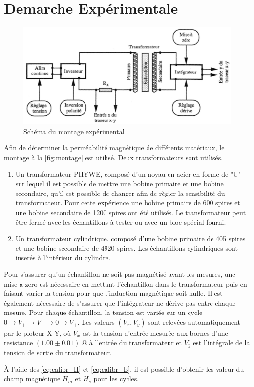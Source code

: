 \section{Demarche Expérimentale}

\begin{figure}[h]
    \centering
    \includegraphics[width=0.8\linewidth]{figures/montage.png}
    \caption{Schéma du montage expérimental \cite{notice}}
    \label{fig:montage}
\end{figure}

Afin de déterminer la perméabilité magnétique de différents matériaux, le montage à la \autoref{fig:montage} est utilisé. Deux transformateurs sont utilisés.

\begin{enumerate}
    \item Un transformateur PHYWE, composé d'un noyau en acier en forme de "U" sur lequel il est possible de mettre une bobine primaire et une bobine secondaire, qu'il est possible de changer afin de règler la sensibilité du transformateur. Pour cette expérience une bobine primaire de 600 spires et une bobine secondaire de 1200 spires ont été utilisés. Le transformateur peut être fermé avec les échantillons à tester ou avec un bloc spécial fourni.
    \item Un transformateur cylindrique, composé d'une bobine primaire de 405 spires et une bobine secondaire de 4920 spires. Les échantillons cylindriques sont inserés à l'intérieur du cylindre.
\end{enumerate}

Pour s'assurer qu'un échantillon ne soit pas magnétisé avant les mesures, une mise à zero est nécessaire en mettant l'échantillon dans le transformateur puis en faisant varier la tension pour que l'induction magnétique soit nulle. Il est également nécessaire de s'assurer que l'intégrateur ne dérive pas entre chaque mesure. Pour chaque échantillon, la tension est variée sur un cycle \(0 \rightarrow V_+ \rightarrow V_- \rightarrow 0 \rightarrow V_+\). Les valeurs \((V_x, V_y)\) sont relevées automatiquement par le ploteur X-Y, où \(V_x\) est la tension d'entrée mesurée aux bornes d'une resistance \((1.00 \pm 0.01)\) \si{\ohm} à l'entrée du transformateur et \(V_y\) est l'intégrale de la tension de sortie du transformateur.

À l'aide des \autoref{eq:calibr_H} et \autoref{eq:calibr_B}, il est possible d'obtenir les valeur du champ magnétique \(H_m\) et \(H_s\) pour les cycles.
